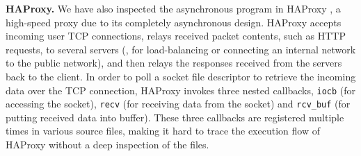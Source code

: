 \vspace{1mm}
\noindent\textbf{HAProxy.}
 We have also inspected the asynchronous program in HAProxy \cite{haproxy}, a high-speed proxy due to its completely asynchronous design. HAProxy accepts incoming user TCP connections, relays received packet contents, such as HTTP requests, to several servers (\eg, for load-balancing or connecting an internal network to the public network), and then relays the responses received from the servers back to the client.
 In order to poll a socket file descriptor to retrieve the incoming data over the TCP connection, HAProxy invokes three nested callbacks, \lstinline[style=InlineStyle]{iocb} (for accessing the socket), \lstinline[style=InlineStyle]{recv} (for receiving data from the socket) and \lstinline[style=InlineStyle]{rcv_buf} (for putting received data into buffer). These three callbacks are registered multiple times in various source files, making it hard to trace the execution flow of HAProxy without a deep inspection of the files.





